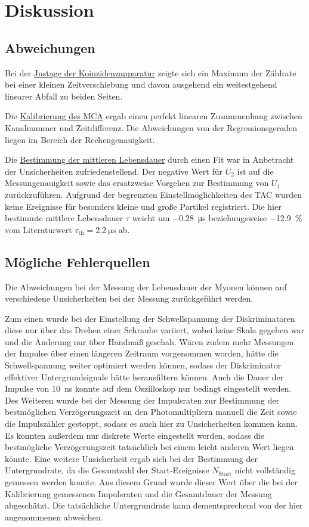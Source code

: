 \section{Diskussion}
\label{sec:diskussion}

\subsection{Abweichungen}
Bei der \hyperref[sec:auswertung:koinzidenz]{Justage der Koinzidenzapparatur} zeigte sich
ein Maximum der Zählrate bei einer kleinen Zeitverschiebung
und davon ausgehend ein weitestgehend linearer Abfall zu beiden Seiten.

Die \hyperref[sec:auswertung:mca]{Kalibrierung des \acs{MCA}} ergab einen perfekt linearen Zusammenhang zwischen Kanalnummer und Zeitdifferenz.
Die Abweichungen von der Regressionsgeraden liegen im Bereich der Rechengenauigkeit.

Die \hyperref[sec:auswertung:lebensdauer]{Bestimmung der mittleren Lebensdauer} durch einen Fit war in Anbetracht der Unsicherheiten zufriedenstellend.
Der negative Wert für $U_2$ ist auf die Messungenauigkeit sowie das ersatzweise Vorgehen zur Bestimmung von $U_1$ zurückzuführen.
Aufgrund der begrenzten Einstellmöglichkeiten des \ac{TAC} wurden keine Ereignisse für besonders kleine und große Partikel registriert.
Die hier bestimmte mittlere Lebensdauer $\tau$
weicht um \SI{-0.28}{\micro\second} beziehungsweise \SI{-12.9}{\percent} vom Literaturwert $\tau_\text{th} = \SI{2.2}{\micro\second}$ \cite{pdg} ab.


\subsection{Mögliche Fehlerquellen}

Die Abweichungen bei der Messung der Lebensdauer der Myonen können auf verschiedene Unsicherheiten bei der Messung zurückgeführt werden.

Zum einen wurde bei der Einstellung der Schwellspannung der Diskriminatoren diese nur über das Drehen einer Schraube variiert,
wobei keine Skala gegeben war und die Änderung nur über Handmaß geschah.
%
Wären zudem mehr Messungen der Impulse über einen längeren Zeitraum vorgenommen worden,
hätte die Schwellspannung weiter optimiert werden können,
sodass der Diskriminator effektiver Untergrundsignale hätte herausfiltern können.
%
Auch die Dauer der Impulse von \SI{10}{\nano\second} konnte auf dem Oszilloskop nur bedingt eingestellt werden.
%
Des Weiteren wurde bei der Messung der Impulsraten zur Bestimmung der bestmöglichen Verzögerungszeit an den Photomultipliern
manuell die Zeit sowie die Impulszähler gestoppt,
sodass es auch hier zu Unsicherheiten kommen kann.
%
Es konnten außerdem nur diskrete Werte eingestellt werden,
sodass die bestmögliche Verzögerungszeit tatsächlich bei einem leicht anderen Wert liegen könnte.
%
Eine weitere Unsicherheit ergab sich bei der Bestimmung der Untergrundrate,
da die Gesamtzahl der Start-Ereignisse $N_\text{Start}$ nicht vollständig gemessen werden konnte.
Aus diesem Grund wurde dieser Wert über die bei der Kalibrierung gemessenen Impulsraten und die Gesamtdauer der Messung abgeschätzt.
Die tatsächliche Untergrundrate kann dementsprechend von der hier angenommenen abweichen.
